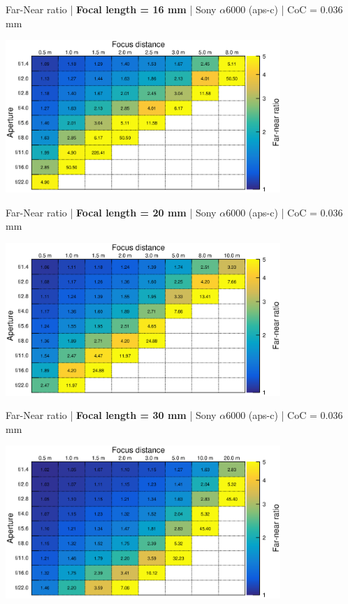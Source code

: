 \documentclass[aspectratio=169]{beamer}
\begin{document}
\begin{frame}[plain]{}
  \vspace{1ex}
  \centering
  Far-Near ratio | {\bf Focal length = 16 mm} |  Sony $\alpha$\hspace{0.1em}6000 (aps-c) | CoC = 0.036 mm
  
  \includegraphics[center,width=0.78\textwidth]{img/far-near-ratio_focl16.eps}
\end{frame}

\begin{frame}[plain]{}
  \vspace{1ex}
  \centering
  Far-Near ratio | {\bf Focal length = 20 mm} |  Sony $\alpha$\hspace{0.1em}6000 (aps-c) | CoC = 0.036 mm
  
  \includegraphics[center,width=0.78\textwidth]{img/far-near-ratio_focl20.eps}
\end{frame}

\begin{frame}[plain]{}
  \vspace{1ex}
  \centering
  Far-Near ratio | {\bf Focal length = 30 mm} |  Sony $\alpha$\hspace{0.1em}6000 (aps-c) | CoC = 0.036 mm
  
  \includegraphics[center,width=0.78\textwidth]{img/far-near-ratio_focl30.eps}
\end{frame}
\end{document}
